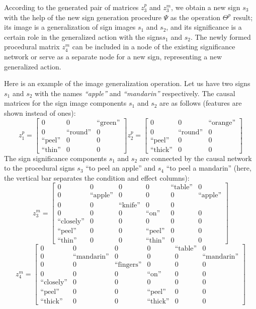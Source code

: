 \documentclass[12pt]{scrartcl}
\begin{document}
	According to the generated pair of matrices $z_3^p$ and $z_3^m$, we obtain a new sign $s_3$ with the help of the new sign generation procedure $\Psi$ as the operation $\Theta^p$ result; its image is a generalization of sign images $s_1$ and $s_2$, and its significance is a certain role in the generalized action with the signs$s_1$ and $s_2$. The newly formed procedural matrix $z_4^m$ can be included in a node of the existing significance network or serve as a separate node for a new sign, representing a new generalized action.
	
	Here is an example of the image generalization operation. Let us have two signs $s_1$ and $s_2$ with the names \textit{``apple''} and \textit{``mandarin''} respectively. The causal matrices for the sign image components $s_1$ and $s_2$ are as follows (features are shown instead of ones):
	\[
	z_1^p = \begin{bmatrix}
	0&0& \text{``green''} \\
	0& \text{``round''} &0 \\
	\text{``peel''} &0 &0  \\
	\text{``thin''} &0 &0
	\end{bmatrix}
	z_2^p = \begin{bmatrix}
	0&0& \text{``orange''} \\
	0& \text{``round''} &0 \\
	\text{``peel''} &0 &0  \\
	\text{``thick''} &0 &0
	\end{bmatrix}
	\]
	The sign significance components $s_1$ and $s_2$ are connected by the causal network to the procedural signs $s_3$ ``to peel an apple'' and $s_4$ ``to peel a mandarin'' (here, the vertical bar separates the condition and effect columns):
	\[
	z_3^m= \left[\begin{array}{ccc|cccc}
	0&0&0&0&\text{``table''}&0\\
	0&\text{``apple''}&0& 0&0&\text{``apple''}\\
	0&0& \text{``knife''} &0 &0\\
	0& 0& 0 &\text{``on''} &0&0\\
	\text{``closely''}& 0& 0 &0 &0&0\\
	\text{``peel''} &0 &0 &\text{``peel''}  &0&0\\
	\text{``thin''} &0 &0 & \text{``thin''} &0&0
	\end{array}
	\right]
	\]
	\[
	z_4^m= \left[\begin{array}{ccc|cccc}
	0&0&0&0&\text{``table''}&0\\
	0&\text{``mandarin''}&0& 0&0&\text{``mandarin''}\\
	0&0& \text{``fingers''} &0 &0&0\\
	0& 0& 0 &\text{``on''} &0&0\\
	\text{``closely''}& 0& 0 &0 &0&0\\
	\text{``peel''} &0 &0 &\text{``peel''}  &0&0\\
	\text{``thick''} &0 &0 & \text{``thick''} &0&0
	\end{array}
	\right]
	\] 
\end{document}
